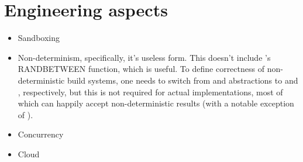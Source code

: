 \clearpage
\section{Engineering aspects}\label{sec-engineering}

\begin{itemize}
    \item Sandboxing
    \item Non-determinism, specifically, it's useless form. This doesn't
          include \Excel's \textsf{RANDBETWEEN} function, which is useful.
          To define correctness of non-deterministic build systems, one needs to
          switch from  and  abstractions to
           and , respectively, but this is not
          required for actual implementations, most of which can happily accept
          non-deterministic results (with a notable exception of \Buck).
    \item Concurrency
    \item Cloud
\end{itemize}
